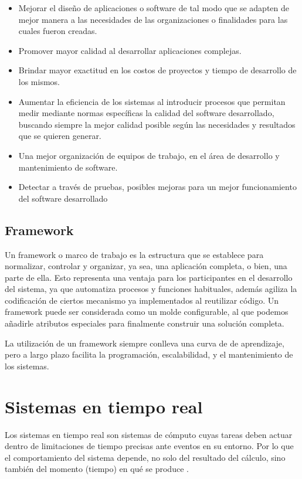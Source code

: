 \begin{itemize}
\item Mejorar el diseño de aplicaciones o software de tal modo que se adapten de mejor manera a las necesidades de las organizaciones o finalidades para las cuales fueron creadas.
\item Promover mayor calidad al desarrollar aplicaciones complejas.
\item Brindar mayor exactitud en los costos de proyectos y tiempo de desarrollo de los mismos.
\item Aumentar la eficiencia de los sistemas al introducir procesos que permitan medir mediante normas específicas la calidad del software desarrollado, buscando siempre la mejor calidad posible según las necesidades y resultados que se quieren generar.
\item Una mejor organización de equipos de trabajo, en el área de desarrollo y mantenimiento de software.
\item Detectar a través de pruebas, posibles mejoras para un mejor funcionamiento del software desarrollado     
\end{itemize}     
     
     \subsection{Framework}
Un framework o marco de trabajo es la estructura que se establece para normalizar, controlar y organizar, ya sea, una aplicación completa, o bien, una parte de ella. Esto representa una ventaja para los participantes en el desarrollo del sistema, ya que automatiza procesos y funciones habituales, además agiliza la codificación de ciertos mecanismo ya implementados al reutilizar código.
Un framework puede ser considerada como un molde configurable, al que podemos añadirle atributos especiales para finalmente construir una solución completa.

\vspace{0.3cm}
La utilización de un framework siempre conlleva una curva de de aprendizaje, pero a largo plazo facilita la programación, escalabilidad, y el mantenimiento de los sistemas.
		
    \section{Sistemas en tiempo real}\label{sec:sistr}

    Los sistemas en tiempo real son sistemas de cómputo cuyas tareas deben actuar dentro de limitaciones de tiempo precisas ante eventos en su entorno. Por lo que el comportamiento del sistema depende, no solo del resultado del cálculo, sino también del momento (tiempo) en qué se produce \cite{Buta2011}.
    
